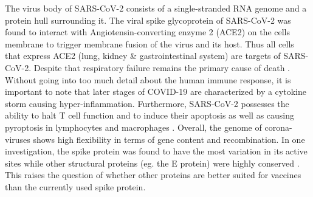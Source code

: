 The virus body of SARS-CoV-2 consists of a single-stranded RNA genome and a protein hull surrounding it. The viral spike glycoprotein of SARS-CoV-2 was found to interact with Angiotensin-converting enzyme 2 (ACE2) on the cells membrane to trigger membrane fusion of the virus and its host. Thus all cells that express ACE2 (lung, kidney \& gastrointestinal system) are targets of SARS-CoV-2. Despite that respiratory failure remains the primary cause of death \cite{Yi_2020}.
Without going into too much detail about the human immune response, it is important to note that later stages of COVID-19 are characterized by a cytokine storm causing hyper-inflammation. Furthermore, SARS-CoV-2 possesses the ability to halt T cell function and to induce their apoptosis as well as causing pyroptosis in lymphocytes and macrophages \cite{Kirtipal_2020}.
Overall, the genome of corona-viruses shows high flexibility in terms of gene content and recombination. In one investigation, the spike protein was found to have the most variation in
its active sites while other structural proteins (eg. the E protein) were highly conserved \cite{Ahmadi_2021}. This raises the question of whether other proteins are better suited for vaccines than the currently used spike protein. \\

